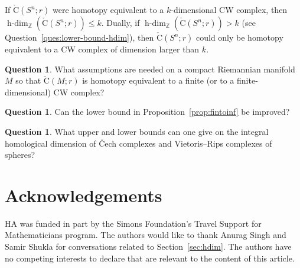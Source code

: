 \documentclass[11 pt,a4paper,twoside,reqno]{amsart}
\theoremstyle{definition}
\newtheorem{question}[theorem]{Question}
\def\Z{{\mathbb Z}}
\def\cB{{\mathcal B}}
\newcommand{\cech}[2]{\mathrm{\check{C}}(#1;#2)}
\DeclareMathOperator{\hdim}{h-dim}
\newcommand{\note}[1]{\textcolor{blue}{({#1})}}
\begin{document}
If $\cech{S^n}{r}$ were homotopy equivalent to a $k$-dimensional CW complex, then $\hdim_{\Z}(\cech{S^n}{r})\le k$.
Dually, if $\hdim_{\Z}(\cech{S^n}{r}) > k$ (see Question~\ref{ques:lower-bound-hdim}), then $\cech{S^n}{r}$ could only be homotopy equivalent to a CW complex of dimension larger than $k$.

\begin{question}
What assumptions are needed on a compact Riemannian manifold $M$ so that $\cech{M}{r}$ is homotopy equivalent to a finite (or to a finite-dimensional) CW complex?
\end{question}

\begin{question}
Can the lower bound in Proposition~\ref{prop:fintoinf} be improved?
\end{question}

\begin{question}
What upper and lower bounds can one give on the integral homological dimension of \v{C}ech complexes and Vietoris--Rips complexes of spheres?
\end{question}



\section*{Acknowledgements}

HA was funded in part by the Simons Foundation’s Travel Support for Mathematicians program.
The authors would like to thank Anurag Singh and Samir Shukla for conversations related to Section~\ref{sec:hdim}.
The authors have no competing interests to declare that are relevant to the content of this article.






\bigskip





\end{document}
